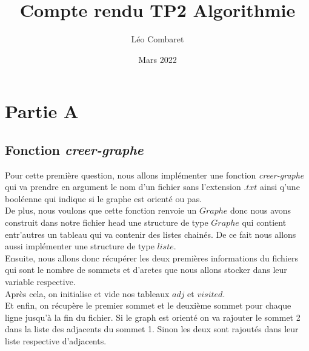 \documentclass[a4paper]{article}
\title{Compte rendu TP2 Algorithmie}
\author{Léo Combaret}
\date{Mars 2022}
\begin{document}
\renewcommand{\arraystretch}{1.5}
\newcommand{\HRule}{\rule{\linewidth}{0.5mm}}
\maketitle

\section{Partie A}

\subsection{Fonction \emph{creer-graphe}}
Pour cette première question, nous allons implémenter une fonction \emph{creer-graphe} 
qui va prendre en argument le nom d'un fichier sans l'extension $.txt$ ainsi q'une booléenne qui indique si le 
graphe est orienté ou pas.\\

De plus, nous voulons que cette fonction renvoie un $Graphe$ donc nous avons construit dans notre fichier head
une structure de type $Graphe$ qui contient entr'autres un tableau qui va contenir des listes chainés. De ce fait
nous allons aussi implémenter une structure de type $liste$.\\

Ensuite, nous allons donc récupérer les deux premières informations du fichiers qui sont le nombre de sommets et d'aretes
que nous allons stocker dans leur variable respective.\\

Après cela, on initialise et vide nos tableaux $adj$ et $visited$.\\
Et enfin, on récupère le premier sommet et le deuxième sommet pour chaque ligne jusqu'à la fin du fichier.
Si le graph est orienté on va rajouter le sommet 2 dans la liste des adjacents du sommet 1. Sinon les deux sont rajoutés dans 
leur liste respective d'adjacents.\\
\end{document}
